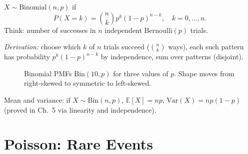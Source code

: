 \begin{definition}[Binomial] $X\sim\mathrm{Binomial}(n,p)$ if
\[
P(X=k)=\binom{n}{k}p^k(1-p)^{n-k},\quad k=0,\dots,n.
\]
Think: number of successes in $n$ independent $\mathrm{Bernoulli}(p)$ trials.
\end{definition}

\emph{Derivation:} choose which $k$ of $n$ trials succeed ($\binom{n}{k}$ ways), each such pattern has probability $p^k(1-p)^{n-k}$ by independence, sum over patterns (disjoint).

\begin{figure}[h]
\centering
{}
\caption{Binomial PMFs $\mathrm{Bin}(10,p)$ for three values of $p$. Shape moves from right-skewed to symmetric to left-skewed.}
\label{fig:binomial-pmfs}
\end{figure}

Mean and variance: if $X\sim\mathrm{Bin}(n,p)$, $\mathbb{E}[X]=np$, $\mathrm{Var}(X)=np(1-p)$ (proved in Ch.~5 via linearity and independence).

\section{Poisson: Rare Events}
\label{sec:poisson}


